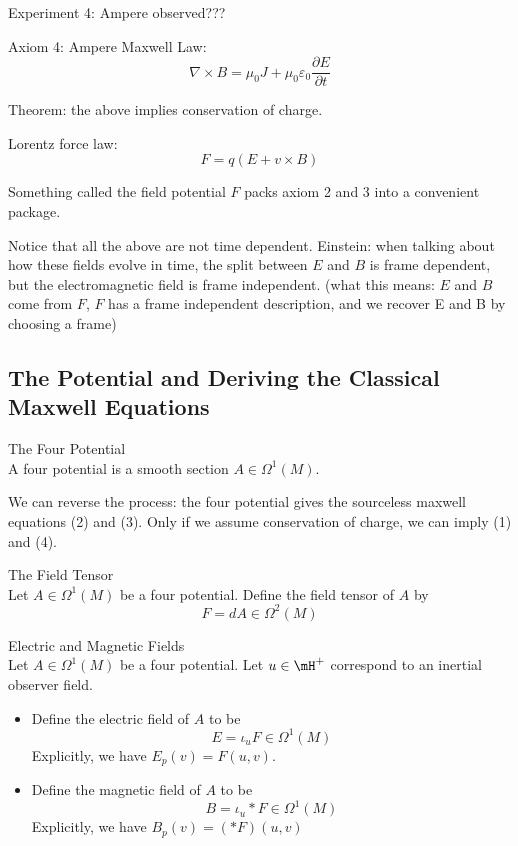 \documentclass[a4paper]{article}
\begin{document}
Experiment 4: Ampere observed???

Axiom 4: Ampere Maxwell Law: $$\nabla\times B=\mu_0J+\mu_0\varepsilon_0\frac{\partial E}{\partial t}$$

Theorem: the above implies conservation of charge. 

Lorentz force law: $$F=q(E+v\times B)$$

Something called the field potential $F$ packs axiom 2 and 3 into a convenient package. 

Notice that all the above are not time dependent. Einstein: when talking about how these fields evolve in time, the split between $E$ and $B$ is frame dependent, but the electromagnetic field is frame independent. (what this means: $E$ and $B$ come from $F$, $F$ has a frame independent description, and we recover E and B by choosing a frame)

\subsection{The Potential and Deriving the Classical Maxwell Equations}
\begin{defn}{The Four Potential}{}\\
A four potential is a smooth section $A\in\Omega^1(M)$. 
\end{defn}

We can reverse the process: the four potential gives the sourceless maxwell equations (2) and (3). Only if we assume conservation of charge, we can imply (1) and (4). 

\begin{defn}{The Field Tensor}{}\\
Let $A\in\Omega^1(M)$ be a four potential. Define the field tensor of $A$ by $$F=dA\in\Omega^2(M)$$
\end{defn}

\begin{defn}{Electric and Magnetic Fields}{}\\
Let $A\in\Omega^1(M)$ be a four potential. Let $u\in\mH^+$ correspond to an inertial observer field. 
\begin{itemize}
\item Define the electric field of $A$ to be $$E=\iota_uF\in\Omega^1(M)$$ Explicitly, we have $E_p(v)=F(u,v)$. 
\item Define the magnetic field of $A$ to be $$B=\iota_u\ast F\in\Omega^1(M)$$ Explicitly, we have $B_p(v)=(\ast F)(u,v)$
\end{itemize}
\end{defn}
\end{document}
